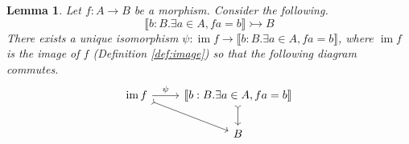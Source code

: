 \documentclass{birkjour}
\theoremstyle{plain}
\newtheorem{lemma}[thm]{Lemma}
\theoremstyle{definition}
\newcommand{\lto}{\longrightarrow}
\begin{document}
	\begin{lemma}\label{lem:image_interpretation}
		Let $f: A \lto B$ be a morphism. Consider the following.
		\begin{equation}
			\llbracket b:B. \exists a \in A, fa = b\rrbracket\rightarrowtail B
		\end{equation}
		There exists a unique isomorphism $\psi:  \operatorname{im}f \lto\llbracket b:B. \exists a \in A, fa = b \rrbracket$, where $\operatorname{im}f$ is the image of $f$ (Definition \ref{def:image}) so that the following diagram commutes.
		\begin{equation}
			\begin{tikzcd}
				\operatorname{im}f\arrow[dr,rightarrowtail]\arrow[r,"{\psi}"] & \llbracket b:B. \exists a \in A, fa = b\rrbracket\arrow[d,rightarrowtail]\\
				& B
			\end{tikzcd}
		\end{equation}
	\end{lemma}
\end{document}
